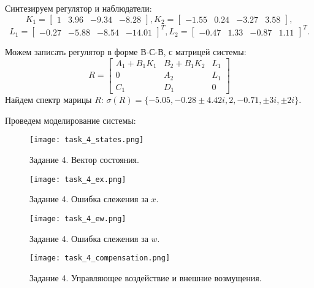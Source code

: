 Синтезируем регулятор и наблюдатели:
\begin{equation*}
    K_1 = \begin{bmatrix}
        1 & 3.96 & -9.34 & -8.28
    \end{bmatrix},
    K_2 = \begin{bmatrix}
        -1.55 & 0.24 & -3.27 & 3.58
    \end{bmatrix},
\end{equation*}
\begin{equation*}
    L_1 = \begin{bmatrix}
        -0.27 & -5.88 & -8.54 & -14.01
    \end{bmatrix}^T,
    L_2 = \begin{bmatrix}
        -0.47 & 1.33 & -0.87 & 1.11
    \end{bmatrix}^T.
\end{equation*}

Можем записать регулятор в форме В-С-В, с матрицей системы:
\begin{equation}
    R = \begin{bmatrix}
        A_1 + B_1K_1 & B_2 + B_1K_2 & L_1 \\
        0 & A_2 & L_1 \\
        C_1 & D_1 & 0
    \end{bmatrix}
\end{equation}
Найдем спектр марицы $R$: $\sigma(R)=\{-5.05, -0.28\pm 4.42i, 2, -0.71, \pm 3i, \pm 2i\}$.

Проведем моделирование системы:
\begin{figure}[h]
    \centering
    \texttt{[image: task\_4\_states.png]}
    \caption{\label{fig:task4_3_2}Задание 4. Вектор состояния.}
\end{figure}
\begin{figure}[]
    \centering
    \texttt{[image: task\_4\_ex.png]}
    \caption{\label{fig:task4_3_2}Задание 4. Ошибка слежения за $x$.}
\end{figure}
\begin{figure}[]
    \centering
    \texttt{[image: task\_4\_ew.png]}
    \caption{\label{fig:task4_3_2}Задание 4. Ошибка слежения за $w$.}
\end{figure}

\begin{figure}[]
    \centering
    \texttt{[image: task\_4\_compensation.png]}
    \caption{\label{fig:task4_3_2}Задание 4. Управляющее воздействие и внешние возмущения.}
\end{figure}


